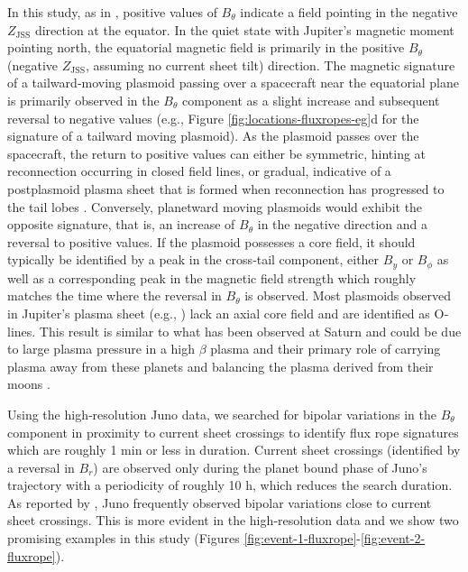 In this study, as in , positive values of $B_\theta$ indicate a field pointing in the negative $Z_\text{JSS}$ direction at the equator. In the quiet state with Jupiter's magnetic moment pointing north, the equatorial magnetic field is primarily in the positive $B_\theta$ (negative $Z_\text{JSS}$, assuming no current sheet tilt) direction. The magnetic signature of a tailward‐moving plasmoid passing over a spacecraft near the equatorial plane is primarily observed in the $B_\theta$ component as a slight increase and subsequent reversal to negative values (e.g., Figure \ref{fig:locations-fluxropes-eg}d for the signature of a tailward moving plasmoid). As the plasmoid passes over the spacecraft, the return to positive values can either be symmetric, hinting at reconnection occurring in closed field lines, or gradual, indicative of a postplasmoid plasma sheet that is formed when reconnection has progressed to the tail lobes \cite{Jackman2011CassiniSaturn,Jia2012}. Conversely, planetward moving plasmoids would exhibit the opposite signature, that is, an increase of $B_\theta$ in the negative direction and a reversal to positive values. If the plasmoid possesses a core field, it should typically be identified by a peak in the cross‐tail component, either $B_y$ or $B_\phi$ as well as a corresponding peak in the magnetic field strength which roughly matches the time where the reversal in $B_\theta$ is observed. Most plasmoids observed in Jupiter's plasma sheet (e.g., ) lack an axial core field and are identified as O‐lines. This result is similar to what has been observed at Saturn \cite{Jackman2011CassiniSaturn} and could be due to large plasma pressure in a high $\beta$ plasma and their primary role of carrying plasma away from these planets and balancing the plasma derived from their moons \cite{Cowley2015Down-tailMagnetospheres,Kivelson1995ModelsPlasmas}.

Using the high‐resolution Juno data, we searched for bipolar variations in the $B_\theta$ component in proximity to current sheet crossings to identify flux rope signatures which are roughly 1 min or less in duration. Current sheet crossings (identified by a reversal in $B_r$) are observed only during the planet bound phase of Juno's trajectory with a periodicity of roughly 10 h, which reduces the search duration. As reported by \cite{Vogt2020MagnetotailObservations}, Juno frequently observed bipolar variations close to current sheet crossings. This is more evident in the high‐resolution data and we show two promising examples in this study (Figures \ref{fig:event-1-fluxrope}-\ref{fig:event-2-fluxrope}). 

